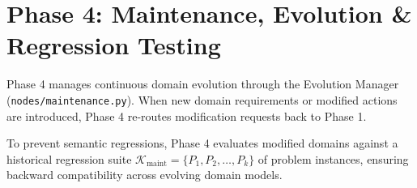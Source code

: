 \section{Phase 4: Maintenance, Evolution \& Regression Testing}
Phase 4 manages continuous domain evolution through the Evolution Manager (\texttt{nodes/maintenance.py}). When new domain requirements or modified actions are introduced, Phase 4 re-routes modification requests back to Phase 1. 

To prevent semantic regressions, Phase 4 evaluates modified domains against a historical regression suite $\mathcal{K}_{\text{maint}} = \{P_1, P_2, \dots, P_k\}$ of problem instances, ensuring backward compatibility across evolving domain models.

